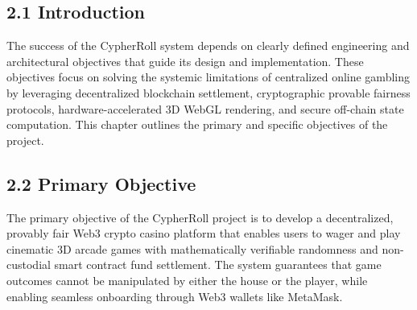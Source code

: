\vspace{1.0cm}
\par
\label{chap:objectives}
\vspace{0.15cm}
\par
\vspace{0.3cm}

\subsection*{2.1 Introduction}
The success of the CypherRoll system depends on clearly defined engineering and architectural objectives that guide its design and implementation. These objectives focus on solving the systemic limitations of centralized online gambling by leveraging decentralized blockchain settlement, cryptographic provable fairness protocols, hardware-accelerated 3D WebGL rendering, and secure off-chain state computation. This chapter outlines the primary and specific objectives of the project.

\subsection*{2.2 Primary Objective}
The primary objective of the CypherRoll project is to develop a decentralized, provably fair Web3 crypto casino platform that enables users to wager and play cinematic 3D arcade games with mathematically verifiable randomness and non-custodial smart contract fund settlement. The system guarantees that game outcomes cannot be manipulated by either the house or the player, while enabling seamless onboarding through Web3 wallets like MetaMask.

